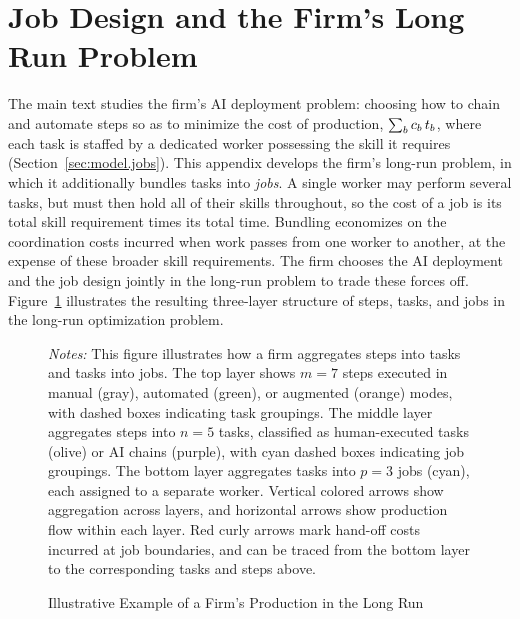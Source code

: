 \section{Job Design and the Firm's Long Run Problem}
\label{app:jobdesign}

The main text studies the firm's AI deployment problem: choosing how to chain and automate steps so as to minimize the cost of production, $\sum_b c_{b}\,t_{b}$, where each task is staffed by a dedicated worker possessing the skill it requires (Section~\ref{sec:model.jobs}).
This appendix develops the firm's long-run problem, in which it additionally bundles tasks into \emph{jobs}.
A single worker may perform several tasks, but must then hold all of their skills throughout, so the cost of a job is its total skill requirement times its total time.
Bundling economizes on the coordination costs incurred when work passes from one worker to another, at the expense of these broader skill requirements. 
The firm chooses the AI deployment and the job design jointly in the long-run problem to trade these forces off.
Figure~\ref{fig:hierarchical_production} illustrates the resulting three-layer structure of steps, tasks, and jobs in the long-run optimization problem.

\begin{figure}[ht!]
  \begin{center}
  \caption{Illustrative Example of a Firm's Production in the Long Run}
  \label{fig:hierarchical_production}

  \vspace{0.4cm}
  
  \end{center}

  \vspace{0.4cm}
  \footnotesize{\emph{Notes:}
  This figure illustrates how a firm aggregates steps into tasks and tasks into jobs.
  The top layer shows $m=7$ steps executed in manual (gray), automated (green), or augmented (orange) modes, with dashed boxes indicating task groupings.
  The middle layer aggregates steps into $n=5$ tasks, classified as human-executed tasks (olive) or AI chains (purple), with cyan dashed boxes indicating job groupings.
  The bottom layer aggregates tasks into $p=3$ jobs (cyan), each assigned to a separate worker.
  Vertical colored arrows show aggregation across layers, and horizontal arrows show production flow within each layer.
  Red curly arrows mark hand-off costs incurred at job boundaries, and can be traced from the bottom layer to the corresponding tasks and steps above.
  }
\end{figure}


